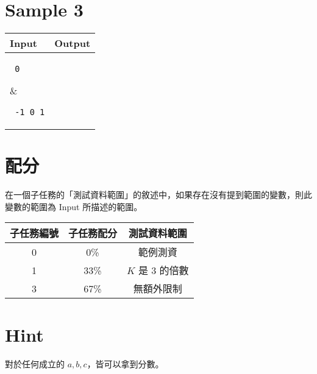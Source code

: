 \documentclass[11pt,a4paper]{article}
\begin{document}
\section*{Sample 3}
\begin{longtable}[!h]{|p{}|p{}|}
\hline
\textbf {Input}	& \textbf {Output} \\
\hline
\parbox[t]{0.5\textwidth} %
{ \tt
0 \\
} &
\parbox[t]{0.5\textwidth}
{ \tt
-1 0 1 \\
} \\
\hline
\end{longtable}

\section*{配分}

在一個子任務的「測試資料範圍」的敘述中，如果存在沒有提到範圍的變數，則此變數的範圍為 Input 所描述的範圍。

\begin{center}
 \begin{tabular}{||c c c||} 
 \hline
 子任務編號 & 子任務配分 & 測試資料範圍 \\  
 \hline\hline
 0 & 0\% & 範例測資 \\ 
 \hline
 1 & 33\% & $K$ 是 $3$ 的倍數 \\
 \hline
 3 & 67\% & 無額外限制 \\
 \hline
\end{tabular}
\end{center}

\section*{Hint}
對於任何成立的 $a, b, c$，皆可以拿到分數。
\end{document}
